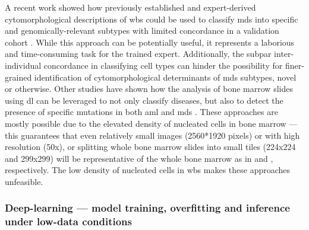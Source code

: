 A recent work showed how previously established and expert-derived cytomorphological descriptions of \ac{wbs} could be used to classify \ac{mds} into specific and genomically-relevant subtypes with limited concordance in a validation cohort \cite{Nagata2020-lh}. While this approach can be potentially useful, it represents a laborious and time-consuming task for the trained expert. Additionally, the subpar inter-individual concordance in classifying cell types can hinder the possibility for finer-grained identification of cytomorphological determinants of \ac{mds} subtypes, novel or otherwise. Other studies have shown how the analysis of bone marrow slides using \ac{dl} can be leveraged to not only classify diseases, but also to detect the presence of specific mutations in both \ac{aml} and \ac{mds} \cite{Bruck2021-fx,Eckardt2021-fb}. These approaches are mostly possible due to the elevated density of nucleated cells in bone marrow --- this guarantees that even relatively small images (2560*1920 pixels) or with high resolution (50x), or splitting whole bone marrow slides into small tiles (224x224 and 299x299) will be representative of the whole bone marrow as in \cite{Eckardt2021-fb} and \cite{Bruck2021-fx}, respectively. The low density of nucleated cells in \ac{wbs} makes these approaches unfeasible.

\subsubsection{Deep-learning --- model training, overfitting and inference under low-data conditions}


